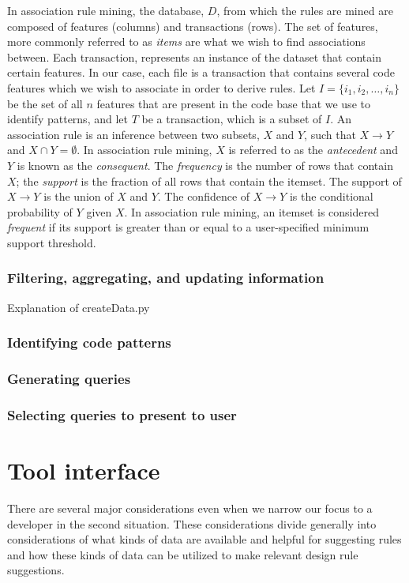 \documentclass[12pt]{article}
\begin{document}
In association rule mining, the database, $D$, from which the rules are mined are composed of features (columns) and transactions (rows). The set of features, more commonly referred to as \textit{items} are what we wish to find associations between. Each transaction, represents an instance of the dataset that contain certain features. In our case, each file is a transaction that contains several code features which we wish to associate in order to derive rules. Let $I=\{i_1, i_2, \ldots, i_n\}$ be the set of all $n$ features that are present in the code base that we use to identify patterns, and let $T$ be a transaction, which is a subset of $I$. An association rule is an inference between two subsets, $X$ and $Y$, such that $X \rightarrow Y$ and $X \cap Y = \emptyset$. In association rule mining, $X$ is referred to as the \textit{antecedent} and $Y$ is known as the \textit{consequent}. The \textit{frequency} is the number of rows that contain $X$; the \textit{support} is the fraction of all rows that contain the itemset. The support of $X \rightarrow Y$ is the union of $X$ and $Y$. The confidence of $X \rightarrow Y$ is the conditional probability of $Y$ given $X$. In association rule mining, an itemset is considered \textit{frequent} if its support is greater than or equal to a user-specified minimum support threshold. 

\subsubsection{Filtering, aggregating, and updating information}
Explanation of createData.py

\subsubsection{Identifying code patterns}


\subsubsection{Generating queries}


\subsubsection{Selecting queries to present to user}

\clearpage


\section{Tool interface} \label{toolInterface}
There are several major considerations even when we narrow our focus to a developer in the second situation. These considerations divide generally into considerations of what kinds of data are available and helpful for suggesting rules and how these kinds of data can be utilized to make relevant design rule suggestions.
\end{document}
